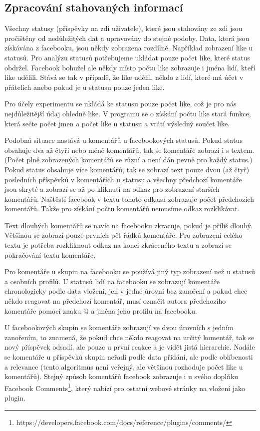 \documentclass[thesis=M,czech]{FITthesis}[2013/05/10]
\begin{document}
\subsection{Zpracování stahovaných informací}

Všechny statusy (příspěvky na zdi uživatele), které jsou stahovány ze zdi jsou pročištěny od nedůležitých dat a upravovány do stejné podoby. Data, která jsou získávána z facebooku, jsou někdy zobrazena rozdílně. Například zobrazení like u statusů. Pro analýzu statusů potřebujeme ukládat pouze počet like, které status obdržel. Facebook bohužel ale někdy místo počtu like zobrazuje i jména lidí, kteří like udělili. Stává se tak v případě, že like udělil, někdo z lidí, které má účet v přátelích anebo pokud je u statusu pouze jeden like.

Pro účely experimentu se ukládá ke statusu pouze počet like, což je pro nás nejdůležitější údaj ohledně like. V programu se o získání počtu like stará funkce, která sečte počet jmen a počet like u statusu a vrátí výsledný součet like. 

Podobná situace nastává u komentářů u facebookových statusů. Pokud status obsahuje dva až čtyři nebo méně komentářů, tak se komentáře zobrazí i s textem. (Počet plně zobrazených komentářů se různí a není dán pevně pro každý status.) Pokud status obsahuje  více komentářů, tak se zobrazí text pouze dvou (až čtyř) posledních příspěvků v komentářích u statusu a všechny předchozí komentáře jsou skryté a zobrazí se až po kliknutí na odkaz pro zobrazení starších komentářů. Naštěstí facebook v textu tohoto odkazu zobrazuje počet předchozích komentářů. Takže pro získání počtu komentářů nemusíme odkaz rozklikávat. 

Text dlouhých komentářů se navíc na facebooku zkracuje, pokud je příliš dlouhý. Většinou se zobrazí pouze prvních pět řádků komentáře. Pro zobrazení celého textu je potřeba rozkliknout odkaz na konci zkráceného textu a zobrazí se pokračování textu komentáře. 

Pro komentáře u skupin na facebooku se používá jiný typ zobrazení než u statusů a osobních profilů. U statusů lidí na facebooku se zobrazují komentáře chronologicky podle data vložení, jen v jedné úrovni bez zanoření a pokud chce někdo reagovat na předchozí komentář, musí označit autora předchozího komentáře pomocí znaku @ a jména jeho profilu na facebooku. 

U facebookových skupin se komentáře zobrazují ve dvou úrovních s jedním zanořením, to znamená, že pokud chce někdo reagovat na určitý komentář, tak se nový příspěvek odsadí, ale pouze u první reakce a je vidět jistá hierarchie. Nadále se komentáře u příspěvků skupin neřadí podle data přidání, ale podle oblíbenosti a relevance (tento algoritmus není veřejný, ale většinou rozhoduje počet like u komentářů). Stejný způsob komentářů facebook zobrazuje i u svého doplňku Facebook Comments\footnote{https://developers.facebook.com/docs/reference/plugins/comments/}, který nabízí pro ostatní webové stránky na vložení jako plugin. 
\end{document}
